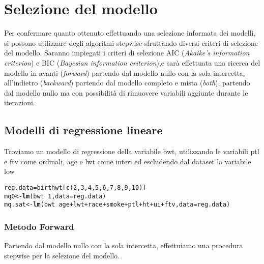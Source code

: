 \documentclass{article}\usepackage[]{graphicx}\usepackage[]{color}
\makeatletter
\newcommand{\hlnum}[1]{\textcolor[rgb]{0.686,0.059,0.569}{#1}}%
\newcommand{\hlopt}[1]{\textcolor[rgb]{0,0,0}{#1}}%
\newcommand{\hlstd}[1]{\textcolor[rgb]{0.345,0.345,0.345}{#1}}%
\newcommand{\hlkwb}[1]{\textcolor[rgb]{0.69,0.353,0.396}{#1}}%
\newcommand{\hlkwc}[1]{\textcolor[rgb]{0.333,0.667,0.333}{#1}}%
\newcommand{\hlkwd}[1]{\textcolor[rgb]{0.737,0.353,0.396}{\textbf{#1}}}%
\newenvironment{kframe}{%
 \def\at@end@of@kframe{}%
 \ifinner\ifhmode%
  \def\at@end@of@kframe{\end{minipage}}%
  \begin{minipage}{\columnwidth}%
 \fi\fi%
 \def\FrameCommand##1{\hskip\@totalleftmargin \hskip-\fboxsep
 \colorbox{shadecolor}{##1}\hskip-\fboxsep
     \hskip-\linewidth \hskip-\@totalleftmargin \hskip\columnwidth}%
 \MakeFramed {\advance\hsize-\width
   \@totalleftmargin\z@ \linewidth\hsize
   \@setminipage}}%
 {\par\unskip\endMakeFramed%
 \at@end@of@kframe}
\newenvironment{knitrout}{}{} %
\makeatother
\begin{document}
\section{Selezione del modello}

Per confermare quanto ottenuto effettuando una selezione informata dei modelli, si possono utilizzare degli algoritmi stepwise sfruttando diversi criteri di selezione del modello.
Saranno impiegati i criteri di selezione AIC (\emph{Akaike's information criterion}) e BIC (\emph{Bayesian information criterion}),e sarà effettuata una ricerca del modello in avanti (\emph{forward}) partendo dal modello nullo con la sola intercetta, all'indietro (\emph{backward}) partendo dal modello completo e mista (\emph{both}), partendo dal modello nullo ma con possibilità di rimuovere variabili aggiunte durante le iterazioni.

\subsection{Modelli di regressione lineare}
Troviamo un modello di regressione della variabile bwt, utilizzando le variabili ptl e ftv come ordinali, age e lwt come interi ed escludendo dal dataset la variabile low

\begin{knitrout}
\color{fgcolor}\begin{kframe}
\begin{alltt}
\hlstd{reg.data} \hlkwb{=} \hlstd{birthwt[}\hlkwd{c}\hlstd{(}\hlnum{2}\hlstd{,}\hlnum{3}\hlstd{,}\hlnum{4}\hlstd{,}\hlnum{5}\hlstd{,}\hlnum{6}\hlstd{,}\hlnum{7}\hlstd{,}\hlnum{8}\hlstd{,}\hlnum{9}\hlstd{,}\hlnum{10}\hlstd{)]}
\hlstd{mq0} \hlkwb{<-} \hlkwd{lm}\hlstd{(bwt} \hlopt{~} \hlnum{1}\hlstd{,}\hlkwc{data}\hlstd{=reg.data)}
\hlstd{mq.sat} \hlkwb{<-} \hlkwd{lm} \hlstd{(bwt} \hlopt{~}\hlstd{age}\hlopt{+}\hlstd{lwt}\hlopt{+}\hlstd{race}\hlopt{+}\hlstd{smoke}\hlopt{+}\hlstd{ptl}\hlopt{+}\hlstd{ht}\hlopt{+}\hlstd{ui}\hlopt{+}\hlstd{ftv,}\hlkwc{data}\hlstd{=reg.data)}
\end{alltt}
\end{kframe}
\end{knitrout}

\subsubsection{Metodo Forward}

Partendo dal modello nullo con la sola intercetta, effettuiamo una procedura stepwise per la selezione del modello.
\end{document}
